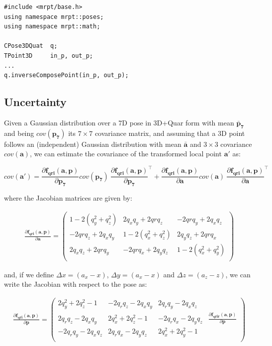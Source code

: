 \documentclass[a4paper,10pt]{report}
\begin{document}
\begin{lstlisting}
#include <mrpt/base.h> 
using namespace mrpt::poses; 
using namespace mrpt::math; 

CPose3DQuat  q;
TPoint3D     in_p, out_p;
...
q.inverseComposePoint(in_p, out_p);
\end{lstlisting}


\subsection{Uncertainty}

Given a Gaussian distribution over a 7D pose in 3D+Quar form with 
mean $\mathbf{\bar{p}_7}$ and being $cov(\mathbf{p_7})$ its $7 \times 7$ covariance matrix,
and assuming that a 3D point follows an (independent) Gaussian distribution 
with mean $\mathbf{\bar{a}}$ and $3 \times 3$ covariance $cov(\mathbf{a})$, 
we can estimate the covariance of the transformed local point $\mathbf{a'}$ 
as:

\begin{equation}
cov(\mathbf{a'}) =
\frac{\partial \mathbf{f_{qri}}( \mathbf{a}, \mathbf{p} )}{\partial \mathbf{p_7}}
cov(\mathbf{p_7})  ~
\frac{\partial \mathbf{f_{qri}}( \mathbf{a}, \mathbf{p} )}{\partial \mathbf{p_7}}^\top 
+
\frac{\partial \mathbf{f_{qri}}( \mathbf{a}, \mathbf{p} )}{\partial \mathbf{a}}
cov(\mathbf{a})  ~
\frac{\partial \mathbf{f_{qri}}( \mathbf{a}, \mathbf{p} )}{\partial \mathbf{a}}^\top 
\end{equation}

\noindent where the Jacobian matrices are given by:

\begin{eqnarray}
\frac{ \partial \mathbf{f_{qri}}( \mathbf{a}, \mathbf{p} )}{\partial \mathbf{a}} = 
\left(\begin{array}{ccc} 
1 - 2 (q_y^2 + q_z^2)   &    2 q_x q_y + 2 qr q_z  &     - 2 qr q_y + 2 q_x q_z \\
-2 qr q_z + 2 q_x q_y &   1 - 2 (q_x^2 + q_z^2) &   2 q_y q_z + 2 qr q_x \\
2 q_x q_z + 2 qr q_y &   -2 qr q_x + 2 q_y q_z & 1 - 2 (q_x^2 + q_y^2 ) \\
\end{array}\right) 
\end{eqnarray}

\noindent and, if we define 
$\Delta x = (a_x - x)$, $\Delta y = (a_x - x)$ and $\Delta z = (a_z - z)$, we can 
write the Jacobian with respect to the pose as:

\begin{eqnarray}
\frac{ \partial \mathbf{f_{qri}}( \mathbf{a}, \mathbf{p} )}{\partial \mathbf{p}} = 
\left(\begin{array}{ccc|c} 
2 q_y^2 + 2 q_z^2 - 1 &   -2 q_r q_z - 2 q_x q_y &  2 q_r q_y - 2 q_x q_z &  ~ 
\\
2 q_r q_z - 2 q_x q_y &  2 q_x^2 + 2 q_z^2 - 1   &  -2 q_r q_x - 2 q_y q_z &  
  \frac{ \partial \mathbf{f_{qrir}}( \mathbf{a}, \mathbf{p} )}{\partial \mathbf{p}}
\\
-2 q_r q_y - 2 q_x q_z &  2 q_r q_x - 2 q_y q_z &  2 q_x^2 + 2 q_y^2 - 1 & ~
\\
\end{array}\right) 
\end{eqnarray}
\end{document}
